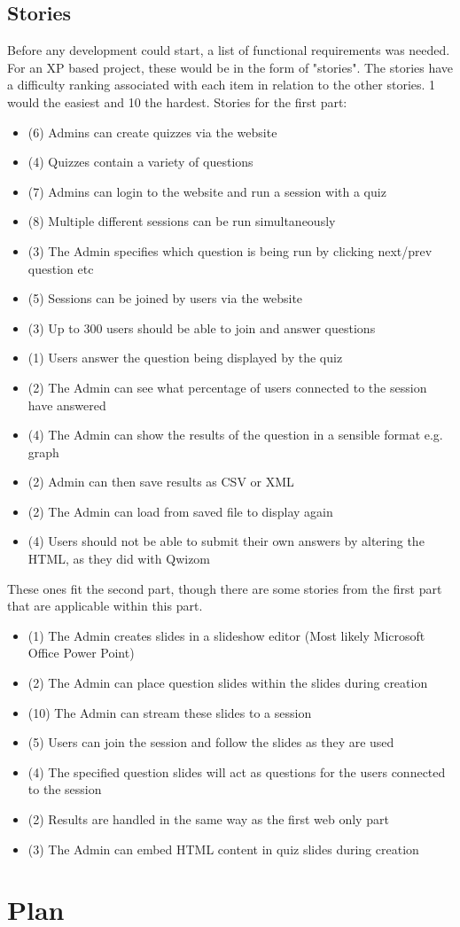 \subsection{Stories}
Before any development could start, a list of functional requirements was needed. For an XP based project, these would be in the form of "stories". The stories have a difficulty ranking associated with each item in relation to the other stories. 1 would the easiest and 10 the hardest.
Stories for the first part:
\begin{itemize}
	\item (6) Admins can create quizzes via the website
	\item (4) Quizzes contain a variety of questions
	\item (7) Admins can login to the website and run a session with a quiz
	\item (8) Multiple different sessions can be run simultaneously
	\item (3) The Admin specifies which question is being run by clicking next/prev question etc
	\item (5) Sessions can be joined by users via the website
	\item (3) Up to 300 users should be able to join and answer questions
	\item (1) Users answer the question being displayed by the quiz
	\item (2) The Admin can see what percentage of users connected to the session have answered
	\item (4) The Admin can show the results of the question in a sensible format e.g. graph
	\item (2) Admin can then save results as CSV or XML
	\item (2) The Admin can load from saved file to display again
	\item (4) Users should not be able to submit their own answers by altering the HTML, as they did with Qwizom
\end{itemize}
These ones fit the second part, though there are some stories from the first part that are applicable within this part.
\begin{itemize}
	\item (1) The Admin creates slides in a slideshow editor (Most likely Microsoft Office Power Point)
	\item (2) The Admin can place question slides within the slides during creation
	\item (10) The Admin can stream these slides to a session
	\item (5) Users can join the session and follow the slides as they are used	
	\item (4) The specified question slides will act as questions for the users connected to the session
	\item (2) Results are handled in the same way as the first web only part
	\item (3) The Admin can embed HTML content in quiz slides during creation
\end{itemize}

\section{Plan}